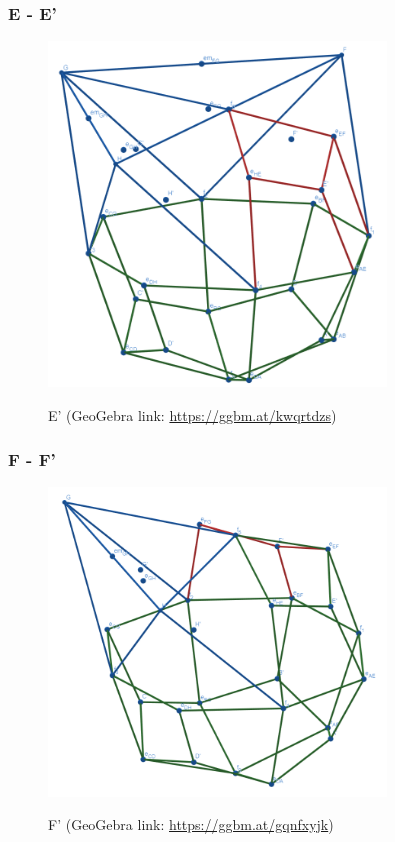 \documentclass{article}
\begin{document}
\subsubsection{E - E'}
\begin{figure}[H]
\caption{E' (GeoGebra link: \href{https://ggbm.at/kwqrtdzs}{https://ggbm.at/kwqrtdzs})}
\centering
\includegraphics[width=0.8\textwidth]{images/cl-07-5.png}
\label{fig:cube7-5}
\end{figure}
\subsubsection{F - F'}
\begin{figure}[H]
\caption{F' (GeoGebra link: \href{https://ggbm.at/gqnfxyjk}{https://ggbm.at/gqnfxyjk})}
\centering
\includegraphics[width=0.8\textwidth]{images/cl-07-6.png}
\label{fig:cube7-6}
\end{figure}
\end{document}
